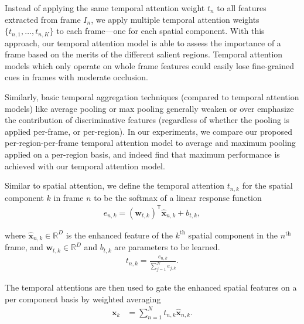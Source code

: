 Instead of applying the same temporal attention weight $t_n$ to all features extracted from frame $I_n$, we apply multiple temporal attention weights $ \{ t_{n,1}, \ldots, t_{n,K} \} $ to each frame---one for each spatial component.  With this approach, our temporal attention model is able to assess the importance of a frame based on the merits of the different salient regions. Temporal attention models which only operate on whole frame features could easily lose fine-grained cues in frames with moderate occlusion.
 
Similarly, basic temporal aggregation techniques (compared to temporal attention models) like average pooling or max pooling generally weaken or over emphasize the contribution of discriminative features (regardless of whether the pooling is applied per-frame, or per-region).  In our experiments, we compare our proposed per-region-per-frame temporal attention model to average and maximum pooling applied on a per-region basis, and indeed find that maximum performance is achieved with our temporal attention model. 

Similar to spatial attention, we define the temporal attention $t_{n,k}$ for the spatial component $k$ in frame $n$ to be the softmax of a linear response function
%
\begin{align}
    e_{n,k} = (\mathbf{w}_{t,k})^\mathsf{T} \widehat{\mathbf{x}}_{n,k} + b_{t,k},
\end{align}

\noindent where $\widehat{\mathbf{x}}_{n,k} \in \mathbb{R}^D$ is the enhanced feature of the $k^\text{th}$ spatial component in the $n^\text{th}$ frame, and $\mathbf{w}_{t,k} \in \mathbb{R}^{D}$ and $b_{t,k}$ are parameters to be learned.  
%
\begin{align}
    t_{n,k} = \frac{e_{n,k}}{\sum_{j=1}^N e_{j,k}}.
\end{align}

The temporal attentions are then used to gate the enhanced spatial features on a per component basis by weighted averaging
%
\begin{align}
\mathbf{x}_k &= \sum_{n=1}^N t_{n,k} \widehat{\mathbf{x}}_{n,k}.
\label{eqn:temporal-attention}
\end{align}

